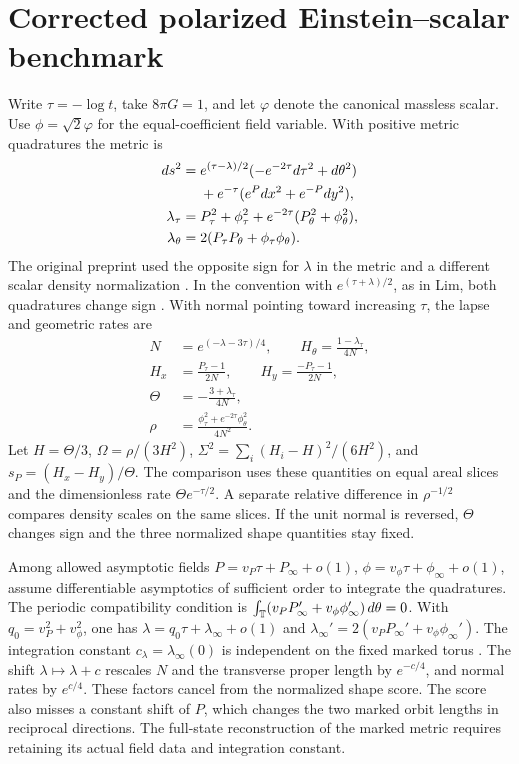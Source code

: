 \section{Corrected polarized Einstein--scalar benchmark}
\label{metric}
Write $\tau=-\log t$, take $8\pi G=1$, and let $\varphi$ denote
the canonical massless scalar. Use $\phi=\sqrt{2}\varphi$ for the
equal-coefficient field variable. With positive metric quadratures
the metric is
\begin{align}
 ds^2={}&e^{(\tau-\lambda)/2}(-e^{-2\tau}d\tau^2+d\theta^2)\notag\\
   &+e^{-\tau}(e^Pdx^2+e^{-P}dy^2),\\
 \lambda_\tau={}& P_\tau^2+\phi_\tau^2
                 +e^{-2\tau}(P_\theta^2+\phi_\theta^2),\\
 \lambda_\theta={}& 2(P_\tau P_\theta+\phi_\tau\phi_\theta).
 \label{constraint}
\end{align}
The original preprint used the opposite sign for $\lambda$ in the
metric and a different scalar density normalization \cite{earlier}.
In the convention with $e^{(\tau+\lambda)/2}$, as in Lim,
both quadratures change sign \cite[Eqs.~(1), (4)--(5)]{lim}.
With normal pointing toward increasing $\tau$, the lapse and
geometric rates are
\begin{align}
 N&=e^{(-\lambda-3\tau)/4},\qquad
 H_\theta=\frac{1-\lambda_\tau}{4N},\\
 H_x&=\frac{P_\tau-1}{2N},\qquad H_y=\frac{-P_\tau-1}{2N},\\
 \Theta&=-\frac{3+\lambda_\tau}{4N},\\
 \rho&=\frac{\phi_\tau^2+e^{-2\tau}\phi_\theta^2}{4N^2}.
\end{align}
Let $H=\Theta/3$, $\Omega=\rho/(3H^2)$,
$\Sigma^2=\sum_i(H_i-H)^2/(6H^2)$, and $s_P=(H_x-H_y)/\Theta$.
The comparison uses these quantities on equal areal slices and the
dimensionless rate $\Theta e^{-\tau/2}$. A separate relative difference
in $\rho^{-1/2}$ compares density scales on the same slices.
If the unit normal is reversed, $\Theta$ changes sign and the
three normalized shape quantities stay fixed.

Among allowed asymptotic fields $P=v_P\tau+P_\infty+o(1)$,
$\phi=v_\phi\tau+\phi_\infty+o(1)$, assume differentiable asymptotics
of sufficient order to integrate the quadratures. The periodic
compatibility condition is
$\int_{\mathbb T}(v_PP_\infty'+v_\phi\phi_\infty')\,d\theta=0$.
With $q_0=v_P^2+v_\phi^2$, one has
$\lambda=q_0\tau+\lambda_\infty+o(1)$ and
$\lambda_\infty'=2(v_PP_\infty'+v_\phi\phi_\infty')$.
The integration constant $c_\lambda=\lambda_\infty(0)$ is
independent on the fixed marked torus \cite[Eq.~(3.19)]{beyer}. The shift
$\lambda\mapsto\lambda+c$ rescales $N$ and the transverse proper
length by $e^{-c/4}$, and normal rates by $e^{c/4}$.
These factors cancel from the normalized shape score.
The score also misses a constant shift of $P$, which changes
the two marked orbit lengths in reciprocal directions.
The full-state reconstruction of the marked metric requires
retaining its actual field data and integration constant.

